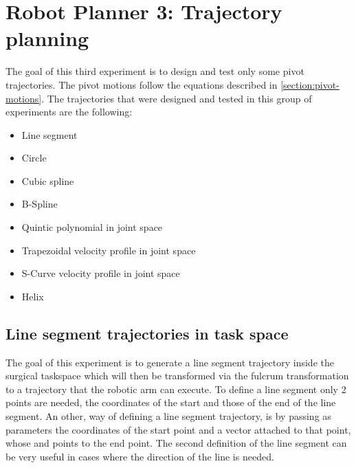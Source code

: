 \section{Robot Planner 3: Trajectory planning}

The goal of this third experiment is to design and test only some pivot trajectories. The pivot motions follow the equations described in 
\ref{section:pivot-motions}. The trajectories that were designed and tested in this group of experiments are the following:
\begin{itemize}
\item Line segment
\item Circle
\item Cubic spline
\item B-Spline
\item Quintic polynomial in joint space
\item Trapezoidal velocity profile in joint space
\item S-Curve velocity profile in joint space
\item Helix
\end{itemize}

\subsection{Line segment trajectories in task space}

The goal of this experiment is to generate a line segment trajectory inside the surgical
taskspace which will then be transformed via the fulcrum transformation to a trajectory that the robotic arm can execute. To define a line segment only 
2 points are needed, the coordinates of the start and those of the end of the line segment. An other, way of defining a line segment trajectory, 
is by passing as parameters the coordinates of the start point and a vector attached to that point, whose and points to the end point. The second definition 
of the line segment can be very useful in cases where the direction of the line is needed.

